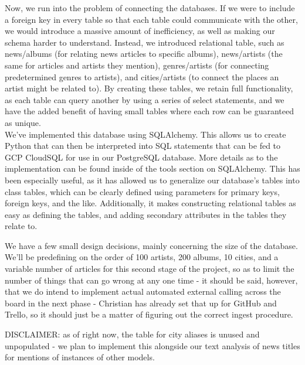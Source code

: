 \documentclass{scrartcl}
\begin{document}
    Now, we run into the problem of connecting the databases.
    If we were to include a foreign key in every table so that each table could communicate with the other, we would introduce a massive amount of inefficiency, as well as making our schema harder to understand.
    Instead, we introduced relational table, such as news/albums (for relating news articles to specific albums), news/artists (the same for articles and artists they mention), genres/artists (for connecting predetermined genres to artists), and cities/artists (to connect the places an artist might be related to).
    By creating these tables, we retain full functionality, as each table can query another by using a series of select statements, and we have the added benefit of having small tables where each row can be guaranteed as unique.\\

    We've implemented this database using SQLAlchemy.
    This allows us to create Python that can then be interpreted into SQL statements that can be fed to GCP CloudSQL for use in our PostgreSQL database.
    More details as to the implementation can be found inside of the tools section on SQLAlchemy.
    This has been especially useful, as it has allowed us to generalize our database's tables into class tables, which can be clearly defined using parameters for primary keys, foreign keys, and the like.
    Additionally, it makes constructing relational tables as easy as defining the tables, and adding secondary attributes in the tables they relate to.

    We have a few small design decisions, mainly concerning the size of the database.
    We'll be predefining on the order of 100 artists, 200 albums, 10 cities, and a variable number of articles for this second stage of the project, so as to limit the number of things that can go wrong at any one time - it should be said, however, that we do intend to implement actual automated external calling across the board in the next phase - Christian has already set that up for GitHub and Trello, so it should just be a matter of figuring out the correct ingest procedure.

    DISCLAIMER: as of right now, the table for city aliases is unused and unpopulated - we plan to implement this alongside our text analysis of news titles for mentions of instances of other models.
\end{document}
